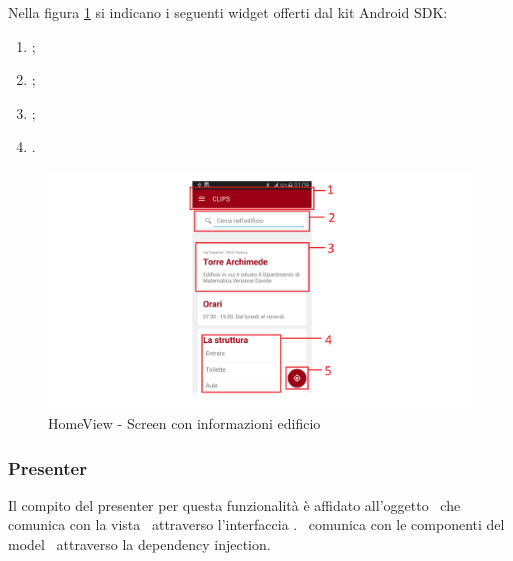 \documentclass[../Funzionalita.tex]{subfiles}
\begin{document}
			Nella figura \ref{fig:LocalizzazioneUtente-HomeView} si indicano i seguenti widget offerti dal kit \gls{Android} SDK:
				\begin{enumerate}
					\item \SearchView;
					\item \TextView;
					\item \ListView;
					\item \FloatingActionButton.
				\end{enumerate}
			

				\begin{figure}[h]
					\centering
					\includegraphics[width=\textwidth]{img/LocalizzazioneUtente-HomeView_}
					\caption{HomeView - Screen con informazioni edificio}
					\label{fig:LocalizzazioneUtente-HomeView}
				\end{figure}
				
				
				
			

		\newpage	
		\subsubsection{Presenter}
			Il compito del presenter per questa funzionalità è affidato all'oggetto \HomeActivity\ che comunica con la vista \HomeViewImp\ attraverso l'interfaccia \HomeView. \HomeActivity\ comunica con le componenti del model \InformationManager\ attraverso la dependency injection.
		
\end{document}
